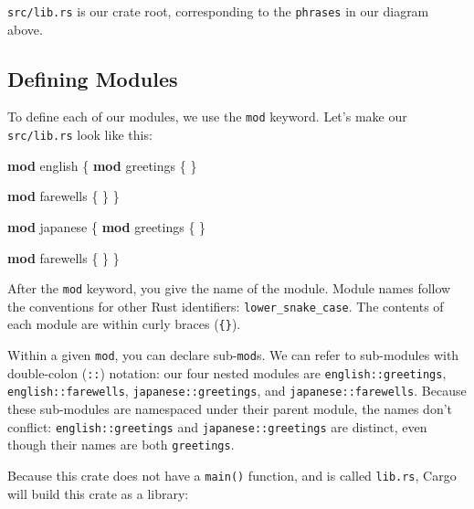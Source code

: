 \documentclass[a4paper,]{book}
\newenvironment{Shaded}{\begin{snugshade}}{\end{snugshade}}
\newcommand{\KeywordTok}[1]{\textcolor[rgb]{0.13,0.29,0.53}{\textbf{{#1}}}}
\newcommand{\NormalTok}[1]{{#1}}
\begin{document}
\texttt{src/lib.rs} is our crate root, corresponding to the
\texttt{phrases} in our diagram above.

\subsection{Defining Modules}\label{defining-modules}

To define each of our modules, we use the \texttt{mod} keyword. Let's
make our \texttt{src/lib.rs} look like this:

\begin{Shaded}
\begin{Highlighting}[]
\KeywordTok{mod} \NormalTok{english \{}
    \KeywordTok{mod} \NormalTok{greetings \{}
    \NormalTok{\}}

    \KeywordTok{mod} \NormalTok{farewells \{}
    \NormalTok{\}}
\NormalTok{\}}

\KeywordTok{mod} \NormalTok{japanese \{}
    \KeywordTok{mod} \NormalTok{greetings \{}
    \NormalTok{\}}

    \KeywordTok{mod} \NormalTok{farewells \{}
    \NormalTok{\}}
\NormalTok{\}}
\end{Highlighting}
\end{Shaded}

After the \texttt{mod} keyword, you give the name of the module. Module
names follow the conventions for other Rust identifiers:
\texttt{lower\_snake\_case}. The contents of each module are within
curly braces (\texttt{\{\}}).

Within a given \texttt{mod}, you can declare sub-\texttt{mod}s. We can
refer to sub-modules with double-colon (\texttt{::}) notation: our four
nested modules are \texttt{english::greetings},
\texttt{english::farewells}, \texttt{japanese::greetings}, and
\texttt{japanese::farewells}. Because these sub-modules are namespaced
under their parent module, the names don't conflict:
\texttt{english::greetings} and \texttt{japanese::greetings} are
distinct, even though their names are both \texttt{greetings}.

Because this crate does not have a \texttt{main()} function, and is
called \texttt{lib.rs}, Cargo will build this crate as a library:

\begin{Shaded}
\end{Shaded}
\end{document}
